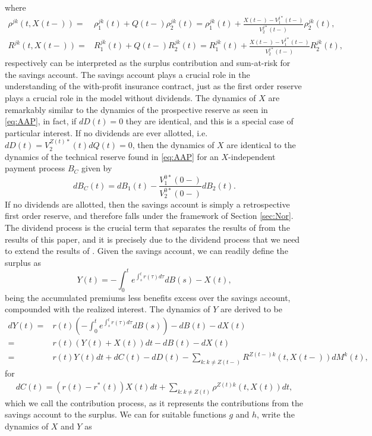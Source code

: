 \documentclass[12pt]{article}
\theoremstyle{my_thm}
\begin{document}
where
\begin{align*}
\rho^{jk}(t,X(t-))=&\rho_1^{jk}(t)+Q(t-)\rho_2^{jk}(t)=\rho_1^{jk}(t)+\frac{X(t-)-V_1^{j*}(t-)}{V_2^{j*}(t-)}\rho_2^{jk}(t),
\\
R^{jk}(t,X(t-))=&R_1^{jk}(t)+Q(t-)R_2^{jk}(t)=R_1^{jk}(t)+\frac{X(t-)-V_1^{j*}(t-)}{V_2^{j*}(t-)}R_2^{jk}(t),
\end{align*}
respectively can be interpreted as the surplus contribution and sum-at-risk for the savings account. The savings account plays a crucial role in the understanding of the with-profit insurance contract, just as the first order reserve plays a crucial role in the model without dividends. The dynamics of $X$ are remarkably similar to the dynamics of the prospective reserve as seen in \eqref{eq:AAP}, in fact, if $dD(t)=0$ they are identical, and this is a special case of particular interest. If no dividends are ever allotted, i.e. $dD(t)=V_2^{Z(t)*}(t)dQ(t)=0$, then the dynamics of $X$ are identical to the dynamics of the technical reserve found in \eqref{eq:AAP} for an $X$-independent payment process $B_C$ given  by
$$
dB_C(t)=dB_1(t)-\frac{V_1^{0*}(0-)}{V_2^{0*}(0-)}dB_2(t).
$$
If no dividends are allotted, then the savings account is simply a retrospective first order reserve, and therefore falls under the framework of Section \ref{sec:Nor}. The dividend process is the crucial term that separates the results of \citet{Norberg} from the results of this paper, and it is precisely due to the dividend process that we need to extend the results of \citet{Norberg}. Given the savings account, we can readily define the surplus as
$$
Y(t)= - \int_0^t e^{\int_s^t r(\tau) d\tau} dB(s)-X(t),
$$
being the accumulated premiums less benefits excess over the savings account, compounded with the realized interest. The dynamics of $Y$ are derived to be
\begin{align}
dY(t)=&
 r(t) \left( -\int_0^t e^{\int_s^t r(\tau) d\tau} dB(s) \right) - dB(t) -dX(t) \nonumber
\\
=&
r(t) \left(Y(t) + X(t) \right)dt - dB(t) -dX(t) \nonumber \\
=& r(t) Y(t) dt + dC(t)-dD(t)-
\sum_{k:k \neq Z(t-)}  R^{Z(t-)k}(t,X(t-)) dM^k(t), \label{eq:AAC}
\end{align}
for 
\begin{gather*}
dC(t)=(r(t)-r^*(t))X(t)dt+\sum_{k:k\neq Z(t)} \rho^{Z(t)k}(t,X(t)) dt,
\end{gather*}
which we call the contribution process, as it represents the contributions from the savings account to the surplus.  We can for suitable functions $g$ and $h$, write the dynamics of $X$ and $Y$ as
\end{document}

